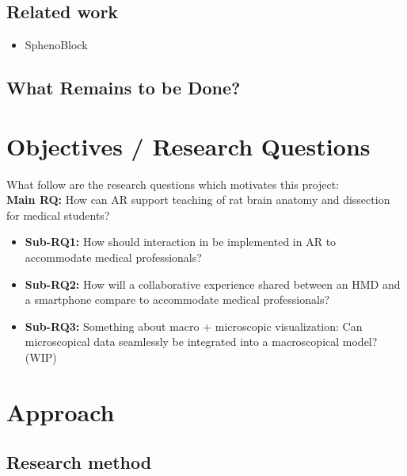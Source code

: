 \subsection*{Related work}

{
    \color{BrickRed}
    \begin{itemize}
        \item SphenoBlock

    \end{itemize}
}

\subsection*{What Remains to be Done?}

\section{Objectives / Research Questions}
What follow are the research questions which motivates this project: \\
\noindent
\textbf{Main RQ:} How can AR support teaching of rat brain anatomy and dissection for medical students?
\begin{itemize}
    \item {
        \textbf{Sub-RQ1:} How should interaction in be implemented in AR to accommodate medical professionals?
    }
    \item {
        \textbf{Sub-RQ2:} How will a collaborative experience shared between an HMD and a smartphone compare to accommodate medical professionals?
    }
    \item {
        \color{BrickRed}
        \textbf{Sub-RQ3: }
        Something about macro + microscopic visualization:
        Can microscopical data seamlessly be integrated into a macroscopical model? (WIP)
    }
\end{itemize}


\section{Approach}


\subsection*{Research method}

